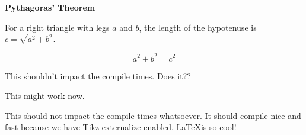 \begin{proposition}
    \textbf{Pythagoras' Theorem}

    For a right triangle with legs $a$ and $b$, the length of the hypotenuse is
    $c = \sqrt{a^2 + b^2}$.

    \begin{equation*}
        a^2 + b^2 = c^2
    \end{equation*}
\end{proposition}

This shouldn't impact the compile times. Does it??

This might work now.

This should not impact the compile times whatsoever. It should compile nice and
fast because we have Tikz externalize enabled. \LaTeX is so cool!
